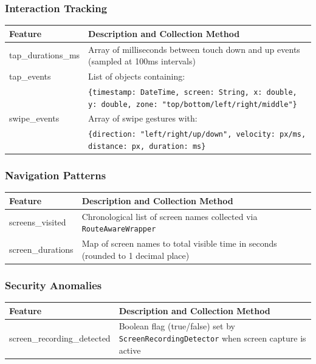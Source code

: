 \documentclass[11pt]{article}
\begin{document}
\subsubsection{Interaction Tracking}
\begin{longtable}{|p{}|p{}|}
    \hline
    \textbf{Feature} & \textbf{Description and Collection Method} \\
    \hline
    tap\_durations\_ms & Array of milliseconds between touch down and up events (sampled at 100ms intervals) \\
    \hline
    tap\_events & List of objects containing: \\
    & \quad \texttt{\{timestamp: DateTime, screen: String, x: double, y: double, zone: "top/bottom/left/right/middle"\}} \\
    \hline
    swipe\_events & Array of swipe gestures with: \\
    & \quad \texttt{\{direction: "left/right/up/down", velocity: px/ms, distance: px, duration: ms\}} \\
    \hline
\end{longtable}

\subsubsection{Navigation Patterns}
\begin{longtable}{|p{}|p{}|}
    \hline
    \textbf{Feature} & \textbf{Description and Collection Method} \\
    \hline
    screens\_visited & Chronological list of screen names collected via \texttt{RouteAwareWrapper} \\
    \hline
    screen\_durations & Map of screen names to total visible time in seconds (rounded to 1 decimal place) \\
    \hline
\end{longtable}

\subsubsection{Security Anomalies}
\begin{longtable}{|p{}|p{}|}
    \hline
    \textbf{Feature} & \textbf{Description and Collection Method} \\
    \hline
    screen\_recording\_detected & Boolean flag (true/false) set by \texttt{ScreenRecordingDetector} when screen capture is active \\
    \hline
\end{longtable}
\end{document}
